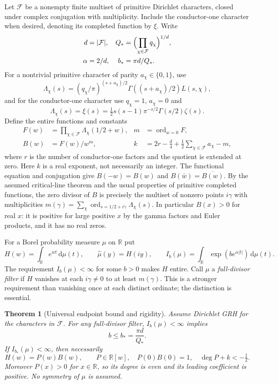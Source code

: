 \documentclass[11pt]{article}
\newtheorem{theorem}{Theorem}[section]
\theoremstyle{remark}\newtheorem{remark}[theorem]{Remark}
\newcommand{\R}{\mathbb R}\newcommand{\C}{\mathbb C}
\newcommand{\F}{\mathcal F}\newcommand{\dd}{\,\mathrm d}
\newcommand{\ord}{\operatorname{ord}}\newcommand{\Rea}{\operatorname{Re}}
\begin{document}
Let $\F$ be a nonempty finite multiset of primitive Dirichlet characters, closed under complex conjugation with multiplicity. Include the conductor-one character when desired, denoting its completed function by $\xi$. Write
\begin{align*}
 d&=|\F|, &Q_*&=\Bigl(\prod_{\chi\in\F}q_\chi\Bigr)^{1/d},\\
 \alpha&=2/d, & b_*&=\pi d/Q_*.
\end{align*}
For a nontrivial primitive character of parity $a_\chi\in\{0,1\}$, use
\[
 \Lambda_\chi(s)=(q_\chi/\pi)^{(s+a_\chi)/2}
   \Gamma((s+a_\chi)/2)L(s,\chi),
\]
and for the conductor-one character use $q_\chi=1$, $a_\chi=0$ and
\[
 \Lambda_\chi(s)=\xi(s)=\tfrac12s(s-1)\pi^{-s/2}\Gamma(s/2)\zeta(s).
\]
Define the entire functions and constants
\begin{align}
 F(w)&=\prod_{\chi\in\F}\Lambda_\chi(1/2+w),&
 m&=\ord_{w=0}F,\label{eq:F}\\
 B(w)&=F(w)/w^m,&
 k&=2r-\frac d4+\frac12\sum_{\chi\in\F}a_\chi-m,\label{eq:k}
\end{align}
where $r$ is the number of conductor-one factors and the quotient is extended at zero. Here $k$ is a real exponent, not necessarily an integer. The functional equation and conjugation give $B(-w)=B(w)$ and $B(\bar w)=\overline{B(w)}$. By the assumed critical-line theorem and the usual properties of primitive completed functions, the zero divisor of $B$ is precisely the multiset of nonzero points $i\gamma$ with multiplicities $m(\gamma)=\sum_\chi\ord_{s=1/2+i\gamma}\Lambda_\chi(s)$. In particular $B(x)>0$ for real $x$: it is positive for large positive $x$ by the gamma factors and Euler products, and it has no real zeros.

For a Borel probability measure $\mu$ on $\R$ put
\[
 H(w)=\int_\R e^{wt}\dd\mu(t),\qquad \widehat\mu(y)=H(iy),\qquad
 I_b(\mu)=\int_\R\exp(b e^{\alpha|t|})\dd\mu(t).
\]
The requirement $I_b(\mu)<\infty$ for some $b>0$ makes $H$ entire. Call $\mu$ a \emph{full-divisor filter} if $H$ vanishes at each $i\gamma\ne0$ to at least $m(\gamma)$. This is a stronger requirement than vanishing once at each distinct ordinate; the distinction is essential.

\begin{theorem}[Universal endpoint bound and rigidity]\label{thm:main}
Assume Dirichlet GRH for the characters in $\F$. For any full-divisor filter, $I_b(\mu)<\infty$ implies
\[
 b\le b_*=\frac{\pi d}{Q_*}.
\]
If $I_{b_*}(\mu)<\infty$, then necessarily
\begin{equation}\label{eq:polynomial}
 H(w)=P(w)B(w),\qquad P\in\R[w],\quad P(0)B(0)=1,\quad
 \deg P+k<-\tfrac12.
\end{equation}
Moreover $P(x)>0$ for $x\in\R$, so its degree is even and its leading coefficient is positive. No symmetry of $\mu$ is assumed.
\end{theorem}
\end{document}
